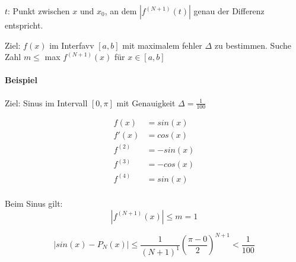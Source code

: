 $t$: Punkt zwischen $x$ und $x_0$, an dem $\left| f^{(N+1)}(t) \right|$ genau der Differenz entspricht.

Ziel: $f(x)$ im Interfavv $[a,b]$ mit maximalem fehler $\Delta$ zu bestimmen.
Suche Zahl $m \leq$ max $f^{(N+1)}(x)$ für $x \in [a,b]$

\paragraph{Beispiel}

Ziel: Sinus im Intervall $[0, \pi]$ mit Genauigkeit $\Delta = \frac{1}{100}$

\begin{align*}
	f(x) &= sin(x) \\
	f'(x) &= cos(x) \\
	f^{(2)} &= -sin(x) \\
	f^{(3)} &= -cos(x) \\
	f^{(4)} &= sin(x) \\
\end{align*}

Beim Sinus gilt:
\[
	\left| f^{(N+1)}(x) \right| \leq m = 1
\]

\[
	\left| sin(x) - P_N(x) \right| \leq \frac{1}{(N+1)^1} \left(\frac{\pi-0}{2}\right)^{N+1} < \frac{1}{100}
\]


